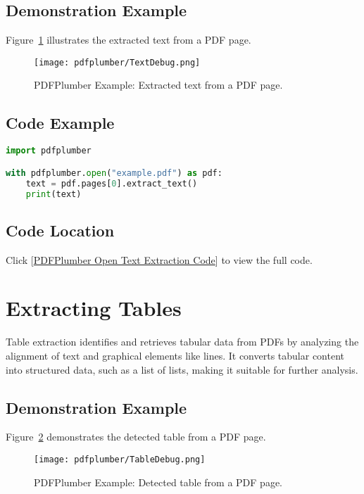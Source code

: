 \subsection{Demonstration Example}
Figure~\ref{fig:PDFPlumber text debug} illustrates the extracted text from a PDF page.

\begin{figure}[h!]
\centering
\texttt{[image: pdfplumber/TextDebug.png]}
\caption{PDFPlumber Example: Extracted text from a PDF page.}
\label{fig:PDFPlumber text debug}
\end{figure}

\subsection{Code Example}
\begin{lstlisting}[language=Python, caption={PDFPlumber Extracting text from a PDF.}]
import pdfplumber

with pdfplumber.open("example.pdf") as pdf:
    text = pdf.pages[0].extract_text()
    print(text)
\end{lstlisting}

\subsection{Code Location}
Click [\href{run:../Code/General/pdfplumber/text.py}{PDFPlumber Open Text Extraction Code}] to view the full code.

\section{Extracting Tables}
\label{sec:extracting tables}

Table extraction identifies and retrieves tabular data from PDFs by analyzing the alignment of text and graphical elements like lines. It converts tabular content into structured data, such as a list of lists, making it suitable for further analysis.

\subsection{Demonstration Example}
Figure~\ref{fig:PDFPlumber table debug} demonstrates the detected table from a PDF page.

\begin{figure}[h!]
\centering
\texttt{[image: pdfplumber/TableDebug.png]}
\caption{PDFPlumber Example: Detected table from a PDF page.}
\label{fig:PDFPlumber table debug}
\end{figure}

